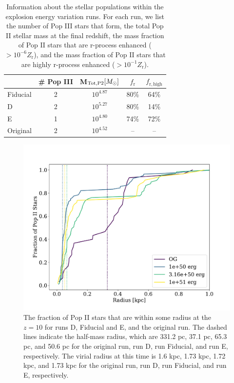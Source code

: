 \documentclass[fleqn,usenatbib]{mnras}
\begin{document}
\begin{table}
	\centering
	\begin{tabular}{lcccc} 
		\hline
		 & \# Pop III & M$_{\mathrm{Tot, P2}} [\Ms]$ & $f_{\mathrm{r}}$ & $f_{\mathrm{r, high}}$ \\
		\hline
		Fiducial & 2 & $10^{4.87}$ & 80\% & 64\% \\
		D & 2 & $10^{5.27}$ & 80\% & 14\% \\
		E & 1 & $10^{4.80}$ & 74\% & 72\% \\
		Original & 2 & $10^{4.52}$ & -- & -- \\
		\hline
	\end{tabular}
	\caption[Information about the stellar populations within the explosion energy variation runs.]{Information about the stellar populations within the explosion energy variation runs. For each run, we list the number of Pop III stars that form, the total Pop II stellar mass at the final redshift, the mass fraction of Pop II stars that are r-process enhanced ($> 10^{-6} Z_{\mathrm{r}}$), and the mass fraction of Pop II stars that are highly r-process enhanced ($> 10^{-1} Z_{\mathrm{r}}$).}
	\label{tab:eng_stellar}
\end{table}

\begin{figure} 
	\includegraphics[width=\columnwidth]{plots/eng_stellar_dist.pdf}
	\caption[Radial distribution of Pop II stars for each explosion energy variation run.]{The fraction of Pop II stars that are within some radius at the $z = 10$ for runs D, Fiducial and E, and the original run. The dashed lines indicate the half-mass radius, which are 331.2 pc, 37.1 pc, 65.3 pc, and 50.6 pc for the original run, run D, run Fiducial, and run E, respectively. The virial radius at this time is 1.6 kpc, 1.73 kpc, 1.72 kpc, and 1.73 kpc for the original run, run D, run Fiducial, and run E, respectively.}
	\label{fig:eng_stellar_dist}
\end{figure}
\end{document}
